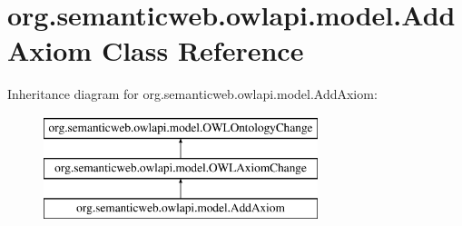 \hypertarget{classorg_1_1semanticweb_1_1owlapi_1_1model_1_1_add_axiom}{\section{org.\-semanticweb.\-owlapi.\-model.\-Add\-Axiom Class Reference}
\label{classorg_1_1semanticweb_1_1owlapi_1_1model_1_1_add_axiom}
}
Inheritance diagram for org.\-semanticweb.\-owlapi.\-model.\-Add\-Axiom\-:\begin{figure}[H]
\begin{center}
\leavevmode
\includegraphics[height=3.000000cm]{classorg_1_1semanticweb_1_1owlapi_1_1model_1_1_add_axiom}
\end{center}
\end{figure}
